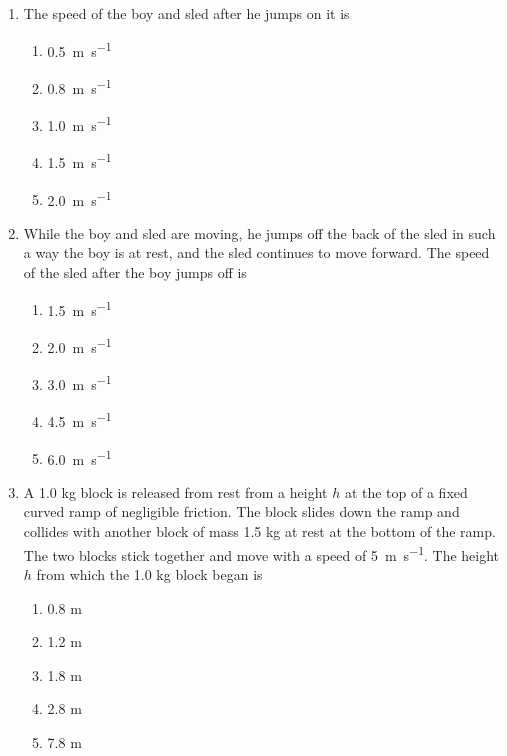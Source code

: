 \documentclass{../../../oss-apphys}
\begin{document}
\begin{multicols}{2}
  \begin{enumerate}[resume,leftmargin=18pt]
  \item The speed of the boy and sled after he jumps on it is
    \label{boy1}
    \begin{enumerate}[nosep,leftmargin=18pt,label=(\Alph*)]
    \item\SI{0.5}{\metre\per\second}
    \item\SI{0.8}{\metre\per\second}
    \item\SI{1.0}{\metre\per\second}
    \item\SI{1.5}{\metre\per\second}
    \item\SI{2.0}{\metre\per\second}
    \end{enumerate}
    
  \item While the boy and sled are moving, he jumps off the back of the sled in
    such a way the boy is at rest, and the sled continues to move forward.
    The speed of the sled after the boy jumps off is
    \label{boy2}
    \begin{enumerate}[nosep,leftmargin=18pt,label=(\Alph*)]
    \item\SI{1.5}{\metre\per\second}
    \item\SI{2.0}{\metre\per\second}
    \item\SI{3.0}{\metre\per\second}
    \item\SI{4.5}{\metre\per\second}
    \item\SI{6.0}{\metre\per\second}
    \end{enumerate}
    \columnbreak
    
  \item A 1.0 kg block is released from rest from a height $h$ at the top of a
    fixed curved ramp of negligible friction. The block slides down the
    ramp and collides with another block of mass 1.5 kg at rest at the
    bottom of the ramp. The two blocks stick together and move with a
    speed of \SI{5}{\metre\per\second}. The height $h$ from which the 1.0 kg
    block began is
    \begin{enumerate}[nosep,leftmargin=18pt,label=(\Alph*)]
    \item 0.8 m
    \item 1.2 m
    \item 1.8 m
    \item 2.8 m
    \item 7.8 m
    \end{enumerate}


\end{enumerate}
\end{multicols}
\end{document}
